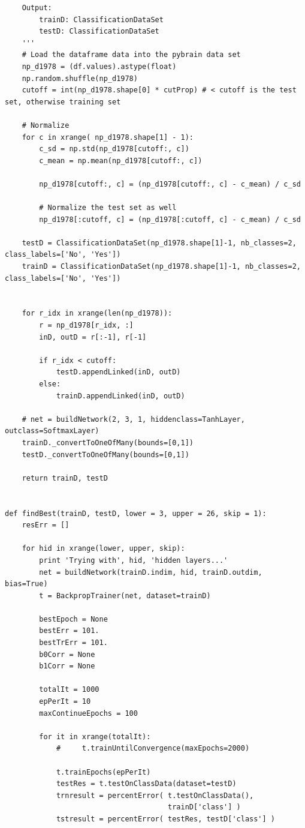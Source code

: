 \documentclass[a4paper]{article}
\theoremstyle{plain}
\begin{document}
\begin{verbatim}
    Output:
        trainD: ClassificationDataSet 
        testD: ClassificationDataSet        
    '''
    # Load the dataframe data into the pybrain data set
    np_d1978 = (df.values).astype(float)
    np.random.shuffle(np_d1978)
    cutoff = int(np_d1978.shape[0] * cutProp) # < cutoff is the test set, otherwise training set

    # Normalize
    for c in xrange( np_d1978.shape[1] - 1):
        c_sd = np.std(np_d1978[cutoff:, c])
        c_mean = np.mean(np_d1978[cutoff:, c])

        np_d1978[cutoff:, c] = (np_d1978[cutoff:, c] - c_mean) / c_sd

        # Normalize the test set as well
        np_d1978[:cutoff, c] = (np_d1978[:cutoff, c] - c_mean) / c_sd   

    testD = ClassificationDataSet(np_d1978.shape[1]-1, nb_classes=2, class_labels=['No', 'Yes'])
    trainD = ClassificationDataSet(np_d1978.shape[1]-1, nb_classes=2, class_labels=['No', 'Yes'])    
    

    for r_idx in xrange(len(np_d1978)):
        r = np_d1978[r_idx, :]
        inD, outD = r[:-1], r[-1]

        if r_idx < cutoff:
            testD.appendLinked(inD, outD)
        else:
            trainD.appendLinked(inD, outD)

    # net = buildNetwork(2, 3, 1, hiddenclass=TanhLayer, outclass=SoftmaxLayer)
    trainD._convertToOneOfMany(bounds=[0,1])
    testD._convertToOneOfMany(bounds=[0,1])
    
    return trainD, testD


def findBest(trainD, testD, lower = 3, upper = 26, skip = 1):
    resErr = []

    for hid in xrange(lower, upper, skip):
        print 'Trying with', hid, 'hidden layers...'
        net = buildNetwork(trainD.indim, hid, trainD.outdim, bias=True)
        t = BackpropTrainer(net, dataset=trainD)    

        bestEpoch = None
        bestErr = 101.
        bestTrErr = 101.
        b0Corr = None
        b1Corr = None

        totalIt = 1000
        epPerIt = 10
        maxContinueEpochs = 100

        for it in xrange(totalIt):    
            #     t.trainUntilConvergence(maxEpochs=2000)

            t.trainEpochs(epPerIt)
            testRes = t.testOnClassData(dataset=testD)
            trnresult = percentError( t.testOnClassData(),
                                      trainD['class'] )
            tstresult = percentError( testRes, testD['class'] )


\end{verbatim}
\end{document}
